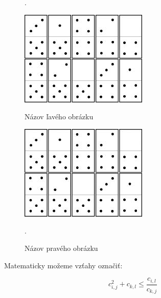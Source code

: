 \begin{figure}[ht]
\phantom.\hfill
%
\begin{minipage}{0.4\linewidth}
\begin{center}
\includegraphics[width=.8\textwidth]{domino.jpg}
\caption{Názov ľavého obrázku}
\label{obrL1}
\end{center}
\end{minipage}
%
\hfill
%
\begin{minipage}{0.4\linewidth}
\begin{center}
\includegraphics[width=.8\textwidth]{domino.jpg}
\caption{Názov pravého obrázku}
\label{obrP1}
\end{center}
\end{minipage}
%
\hfill\phantom.
\end{figure}



Matematicky možeme vzťahy označiť:

\begin{equation}
\label{nerov1}
c_{i,j}^2+c_{k,l} \le \frac{c_{i,l}}{c_{k,j}}
\end{equation}

